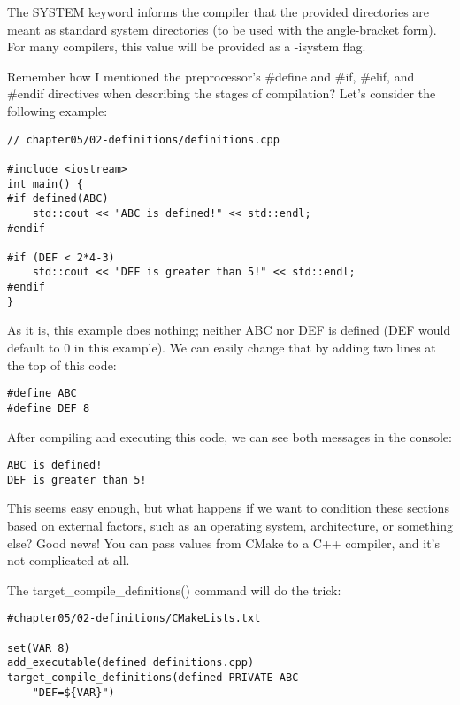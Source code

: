 The SYSTEM keyword informs the compiler that the provided directories are meant as standard system directories (to be used with the angle-bracket form). For many compilers, this value will be provided as a -isystem flag.


Remember how I mentioned the preprocessor's \#define and \#if, \#elif, and \#endif directives when describing the stages of compilation? Let's consider the following example:

\begin{lstlisting}[style=styleCXX]
// chapter05/02-definitions/definitions.cpp

#include <iostream>
int main() {
#if defined(ABC)
	std::cout << "ABC is defined!" << std::endl;
#endif

#if (DEF < 2*4-3)
	std::cout << "DEF is greater than 5!" << std::endl;
#endif
}
\end{lstlisting}

As it is, this example does nothing; neither ABC nor DEF is defined (DEF would default to 0 in this example). We can easily change that by adding two lines at the top of this code:

\begin{lstlisting}[style=styleCXX]
#define ABC
#define DEF 8
\end{lstlisting}

After compiling and executing this code, we can see both messages in the console:

\begin{lstlisting}[style=styleCXX]
ABC is defined!
DEF is greater than 5!
\end{lstlisting}

This seems easy enough, but what happens if we want to condition these sections based on external factors, such as an operating system, architecture, or something else? Good news! You can pass values from CMake to a C++ compiler, and it's not complicated at all.

The target\_compile\_definitions() command will do the trick:

\begin{lstlisting}[style=styleCMake]
#chapter05/02-definitions/CMakeLists.txt

set(VAR 8)
add_executable(defined definitions.cpp)
target_compile_definitions(defined PRIVATE ABC
	"DEF=${VAR}")
\end{lstlisting}

